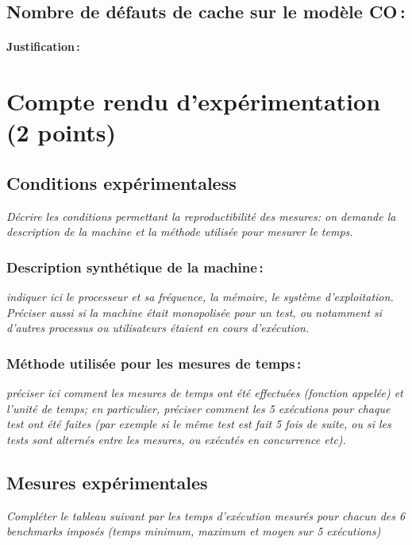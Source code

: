 \documentclass[a4paper, 10pt, french]{article}
\begin{document}
  \subsection{Nombre de défauts de cache sur le modèle CO\,: }
    \paragraph{Justification\,: }


\section{Compte rendu d'expérimentation (2 points)}
  \subsection{Conditions expérimentaless}
     {\em Décrire les conditions permettant la reproductibilité des mesures: on demande la description
      de la machine et la méthode utilisée pour mesurer le temps.
     }

    \subsubsection{Description synthétique de la machine\,:} 
      {\em indiquer ici le  processeur et sa fréquence, la mémoire, le système d'exploitation. 
       Préciser aussi si la machine était monopolisée pour un test, ou notamment si 
       d'autres processus ou utilisateurs étaient en cours d'exécution. 
      } 

    \subsubsection{Méthode utilisée pour les mesures de temps\,: } 
      {\em préciser ici  comment les mesures de temps ont été effectuées (fonction appelée) et l'unité de temps; en particulier, 
       préciser comment les 5 exécutions pour chaque test ont été faites (par exemple si le même test est fait 5 fois de suite, ou si les tests sont alternés entre
       les mesures, ou exécutés en concurrence etc). 
      }

  \subsection{Mesures expérimentales}
    {\em Compléter le tableau suivant par les temps d'exécution mesurés pour chacun des 6 benchmarks imposés
              (temps minimum, maximum et moyen sur 5 exécutions)
    }
\end{document}
